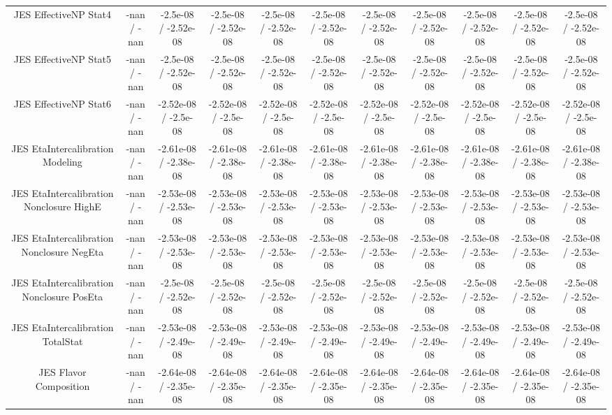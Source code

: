 \begin{table}[htbp]
\begin{center}
\begin{tabular}{|c|c|c|c|c|c|c|c|c|c|c|}
  JES EffectiveNP Stat4 & -nan / -nan & -2.5e-08 / -2.52e-08 & -2.5e-08 / -2.52e-08 & -2.5e-08 / -2.52e-08 & -2.5e-08 / -2.52e-08 & -2.5e-08 / -2.52e-08 & -2.5e-08 / -2.52e-08 & -2.5e-08 / -2.52e-08 & -2.5e-08 / -2.52e-08 & -2.5e-08 / -2.52e-08 \\ 
  JES EffectiveNP Stat5 & -nan / -nan & -2.5e-08 / -2.52e-08 & -2.5e-08 / -2.52e-08 & -2.5e-08 / -2.52e-08 & -2.5e-08 / -2.52e-08 & -2.5e-08 / -2.52e-08 & -2.5e-08 / -2.52e-08 & -2.5e-08 / -2.52e-08 & -2.5e-08 / -2.52e-08 & -2.5e-08 / -2.52e-08 \\ 
  JES EffectiveNP Stat6 & -nan / -nan & -2.52e-08 / -2.5e-08 & -2.52e-08 / -2.5e-08 & -2.52e-08 / -2.5e-08 & -2.52e-08 / -2.5e-08 & -2.52e-08 / -2.5e-08 & -2.52e-08 / -2.5e-08 & -2.52e-08 / -2.5e-08 & -2.52e-08 / -2.5e-08 & -2.52e-08 / -2.5e-08 \\ 
  JES EtaIntercalibration Modeling & -nan / -nan & -2.61e-08 / -2.38e-08 & -2.61e-08 / -2.38e-08 & -2.61e-08 / -2.38e-08 & -2.61e-08 / -2.38e-08 & -2.61e-08 / -2.38e-08 & -2.61e-08 / -2.38e-08 & -2.61e-08 / -2.38e-08 & -2.61e-08 / -2.38e-08 & -2.61e-08 / -2.38e-08 \\ 
  JES EtaIntercalibration Nonclosure HighE & -nan / -nan & -2.53e-08 / -2.53e-08 & -2.53e-08 / -2.53e-08 & -2.53e-08 / -2.53e-08 & -2.53e-08 / -2.53e-08 & -2.53e-08 / -2.53e-08 & -2.53e-08 / -2.53e-08 & -2.53e-08 / -2.53e-08 & -2.53e-08 / -2.53e-08 & -2.53e-08 / -2.53e-08 \\ 
  JES EtaIntercalibration Nonclosure NegEta & -nan / -nan & -2.53e-08 / -2.53e-08 & -2.53e-08 / -2.53e-08 & -2.53e-08 / -2.53e-08 & -2.53e-08 / -2.53e-08 & -2.53e-08 / -2.53e-08 & -2.53e-08 / -2.53e-08 & -2.53e-08 / -2.53e-08 & -2.53e-08 / -2.53e-08 & -2.53e-08 / -2.53e-08 \\ 
  JES EtaIntercalibration Nonclosure PosEta & -nan / -nan & -2.5e-08 / -2.52e-08 & -2.5e-08 / -2.52e-08 & -2.5e-08 / -2.52e-08 & -2.5e-08 / -2.52e-08 & -2.5e-08 / -2.52e-08 & -2.5e-08 / -2.52e-08 & -2.5e-08 / -2.52e-08 & -2.5e-08 / -2.52e-08 & -2.5e-08 / -2.52e-08 \\ 
  JES EtaIntercalibration TotalStat & -nan / -nan & -2.53e-08 / -2.49e-08 & -2.53e-08 / -2.49e-08 & -2.53e-08 / -2.49e-08 & -2.53e-08 / -2.49e-08 & -2.53e-08 / -2.49e-08 & -2.53e-08 / -2.49e-08 & -2.53e-08 / -2.49e-08 & -2.53e-08 / -2.49e-08 & -2.53e-08 / -2.49e-08 \\ 
  JES Flavor Composition & -nan / -nan & -2.64e-08 / -2.35e-08 & -2.64e-08 / -2.35e-08 & -2.64e-08 / -2.35e-08 & -2.64e-08 / -2.35e-08 & -2.64e-08 / -2.35e-08 & -2.64e-08 / -2.35e-08 & -2.64e-08 / -2.35e-08 & -2.64e-08 / -2.35e-08 & -2.64e-08 / -2.35e-08 \\ 

\end{tabular}
\end{center}
\end{table}
